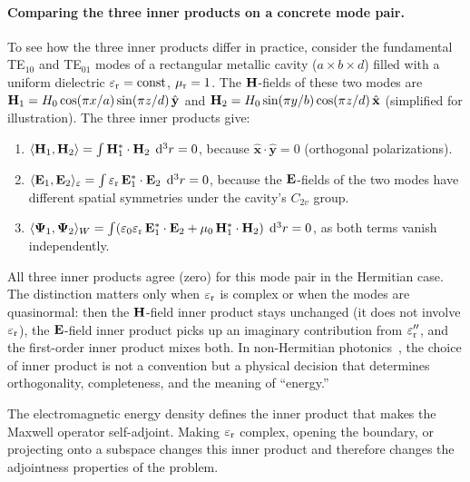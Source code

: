 \paragraph{Comparing the three inner products on a concrete mode pair.}
To see how the three inner products differ in practice, consider the
fundamental TE$_{10}$ and TE$_{01}$ modes of a rectangular metallic
cavity ($a \times b \times d$) filled with a uniform dielectric
$\varepsilon_{\mathrm{r}} = \mathrm{const}$, $\mu_{\mathrm{r}} = 1$. The $\mathbf{H}$-fields of these two
modes are $\mathbf{H}_1 = H_0\cos(\pi x/a)\sin(\pi z/d)\,\hat{\mathbf{y}}$ and
$\mathbf{H}_2 = H_0\sin(\pi y/b)\cos(\pi z/d)\,\hat{\mathbf{x}}$ (simplified for
illustration). The three inner products give:
\begin{enumerate}
 \item $\langle\mathbf{H}_1,\mathbf{H}_2\rangle = \int \mathbf{H}_1^*\cdot\mathbf{H}_2\;\mathop{}\!\mathrm{d}^3r
 = 0$, because $\hat{\mathbf{x}}\cdot\hat{\mathbf{y}} = 0$ (orthogonal
 polarizations).
 \item $\langle\mathbf{E}_1,\mathbf{E}_2\rangle_\varepsilon
 = \int \varepsilon_{\mathrm{r}}\,\mathbf{E}_1^*\cdot\mathbf{E}_2\;\mathop{}\!\mathrm{d}^3r = 0$, because the
 $\mathbf{E}$-fields of the two modes have different spatial symmetries
 under the cavity's $C_{2v}$ group.
 \item $\langle\mathbf{\Psi}_1,\mathbf{\Psi}_2\rangle_W
 = \int(\varepsilon_0\varepsilon_{\mathrm{r}}\,\mathbf{E}_1^*\cdot\mathbf{E}_2
 + \mu_0\,\mathbf{H}_1^*\cdot\mathbf{H}_2)\;\mathop{}\!\mathrm{d}^3r = 0$, as both terms vanish
 independently.
\end{enumerate}
All three inner products agree (zero) for this mode pair in the
Hermitian case. The distinction matters only when $\varepsilon_{\mathrm{r}}$ is complex
or when the modes are quasinormal: then the $\mathbf{H}$-field inner product
stays unchanged (it does not involve $\varepsilon_{\mathrm{r}}$), the $\mathbf{E}$-field inner
product picks up an imaginary contribution from $\varepsilon_{\mathrm{r}}''$, and the
first-order inner product mixes both. In non-Hermitian photonics~\cite{kawabata2018symmetry}, the
choice of inner product is not a convention but a physical decision
that determines orthogonality, completeness, and the meaning of
``energy.''

\begin{takeaway}
The electromagnetic energy density defines the inner product that makes
the Maxwell operator self-adjoint. Making $\varepsilon_{\mathrm{r}}$ complex, opening the
boundary, or projecting onto a subspace changes this inner product and
therefore changes the adjointness properties of the problem.
\end{takeaway}


